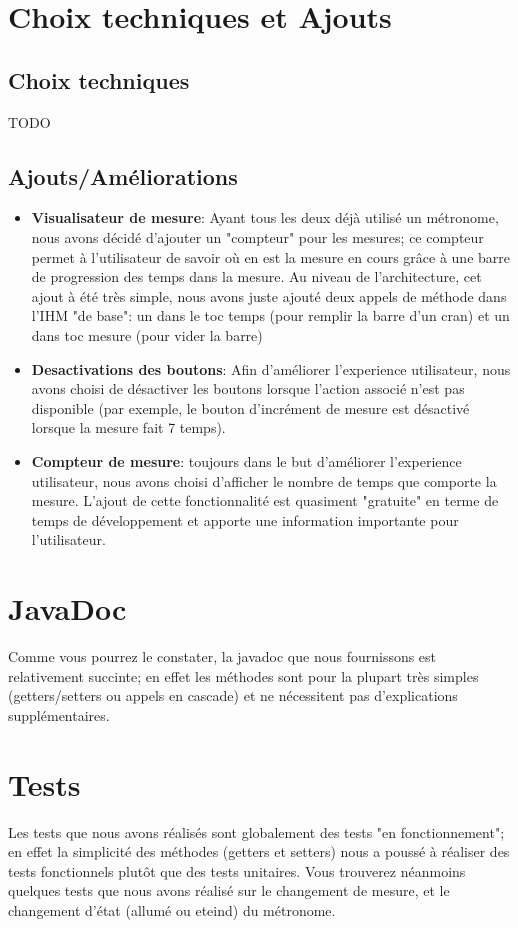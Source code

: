 \documentclass{article}
\begin{document}
\section{Choix techniques et Ajouts}
\subsection{Choix techniques}
TODO


\subsection{Ajouts/Améliorations}
\begin{itemize}
\item \textbf{Visualisateur de mesure}: Ayant tous les deux déjà utilisé un métronome, nous avons décidé d'ajouter un "compteur" pour les mesures; ce compteur permet à l'utilisateur de savoir où en est la mesure en cours grâce à une barre de progression des temps dans la mesure. Au niveau de l'architecture, cet ajout à été très simple, nous avons juste ajouté deux appels de méthode dans l'IHM "de base": un dans le toc temps (pour remplir la barre d'un cran) et un dans toc mesure (pour vider la barre)
\item \textbf{Desactivations des boutons}: Afin d'améliorer l'experience utilisateur, nous avons choisi de désactiver les boutons lorsque l'action associé n'est pas disponible (par exemple, le bouton d'incrément de mesure est désactivé lorsque la mesure fait 7 temps).
\item \textbf{Compteur de mesure}: toujours dans le but d'améliorer l'experience utilisateur, nous avons choisi d'afficher le nombre de temps que comporte la mesure. L'ajout de cette fonctionnalité est quasiment "gratuite" en terme de temps de développement et apporte une information importante pour l'utilisateur.
\end{itemize}

\section{JavaDoc}
Comme vous pourrez le constater, la javadoc que nous fournissons est relativement succinte; en effet les méthodes sont pour la plupart très simples (getters/setters ou appels en cascade) et ne nécessitent pas d'explications supplémentaires. 
\section{Tests}
Les tests que nous avons réalisés sont globalement des tests "en fonctionnement"; en effet la simplicité des méthodes (getters et setters) nous a poussé à réaliser des tests fonctionnels plutôt que des tests unitaires. Vous trouverez néanmoins quelques tests que nous avons réalisé sur le changement de mesure, et le changement d'état (allumé ou eteind) du métronome.
\end{document}
